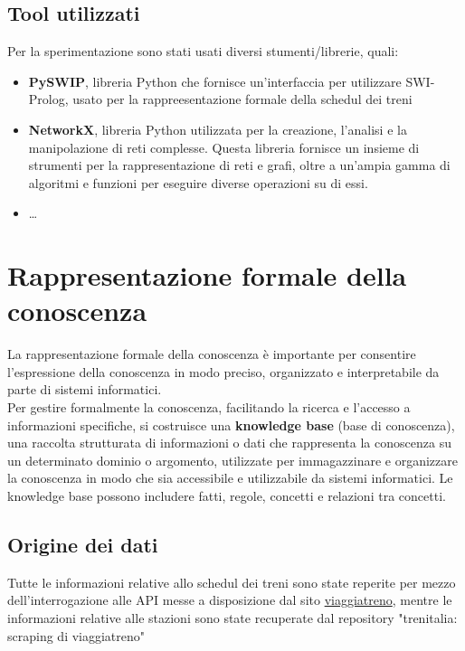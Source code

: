 \documentclass[italian,12pt,a4paper]{article}
\begin{document}
	
	\subsection{Tool utilizzati}
	Per la sperimentazione sono stati usati diversi stumenti/librerie, quali:
	
		\begin{itemize}
			\item \textbf{PySWIP}, libreria Python che fornisce un'interfaccia per utilizzare SWI-Prolog, usato per la rappreesentazione formale della schedul dei treni
			\item \textbf{NetworkX}, libreria Python utilizzata per la creazione, l'analisi e la manipolazione di reti complesse. Questa libreria fornisce un insieme di strumenti per la rappresentazione di reti e grafi, oltre a un'ampia gamma di algoritmi e funzioni per eseguire diverse operazioni su di essi.
			\item \dots
		\end{itemize}

	\section{Rappresentazione formale della conoscenza}
	
	La rappresentazione formale della conoscenza è importante per consentire l'espressione della conoscenza in modo preciso, organizzato e interpretabile da parte di sistemi informatici.\\
	Per gestire formalmente la conoscenza, facilitando la ricerca e l'accesso a informazioni specifiche, si costruisce una \textbf{knowledge base} (base di conoscenza), una raccolta strutturata di informazioni o dati che rappresenta la conoscenza su un determinato dominio o argomento, utilizzate per immagazzinare e organizzare la conoscenza in modo che sia accessibile e utilizzabile da sistemi informatici. Le knowledge base possono includere fatti, regole, concetti e relazioni tra concetti. \\
	
	\subsection{Origine dei dati}
	Tutte le informazioni relative allo schedul dei treni sono state reperite per mezzo dell'interrogazione alle API messe a disposizione dal sito \href{http://www.viaggiatreno.it/infomobilita/index.jsp}{viaggiatreno}, mentre le informazioni relative alle stazioni sono state recuperate dal repository "trenitalia: scraping di viaggiatreno" \cite{dati_stazioni}
	
\end{document}

